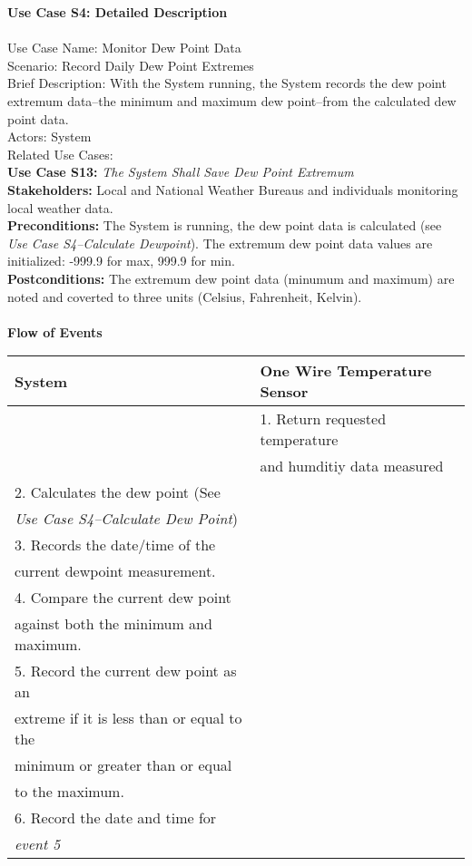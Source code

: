 \documentclass[letterpaper]{article}
\begin{document}
\noindent
\textbf{Use Case S4:  Detailed Description}\\\\
Use Case Name:  Monitor Dew Point Data\\
Scenario:  Record  Daily Dew Point Extremes\\
Brief Description:  With the System running, the System records the
dew point  extremum data--the minimum and maximum dew point--from the
calculated dew point data.\\
Actors:  System\\
Related Use Cases:\\
\textbf{Use Case S13:  }\emph{The System Shall Save Dew Point
Extremum}\\
\textbf{Stakeholders:  }Local and National Weather Bureaus and
individuals monitoring local weather data.\\
\textbf{Preconditions:  }The System is running, the dew point
data is calculated (see \emph{Use Case S4--Calculate Dewpoint}). The
extremum dew point data values are initialized: -999.9 for max, 999.9
for min.\\
\textbf{Postconditions:  }The extremum dew point data (minumum
and maximum) are  noted and coverted to three units (Celsius,
Fahrenheit, Kelvin).\\\\
\textbf{Flow of Events}\\
\begin{tabular}{|l|l|}\hline
\textbf{System} & \textbf{One Wire Temperature Sensor}\\\hline
& 1.  Return requested temperature\\ 
&      and humditiy data  measured\\\hline
2.     Calculates the dew point (See & \\
 \emph{Use Case S4--Calculate Dew Point}) & \\\hline
3.     Records the date/time of the & \\
current dewpoint measurement. & \\\hline
4.     Compare the current dew point & \\
against both the minimum and maximum. &\\\hline
5.     Record the current dew point as an &\\
extreme if it is less than or equal to the &\\
minimum or greater than or equal &\\
to the maximum. & \\\hline
6.    Record the date and time for & \\
\emph{event 5} & \\\hline
\end{tabular}\\\\
\end{document}
